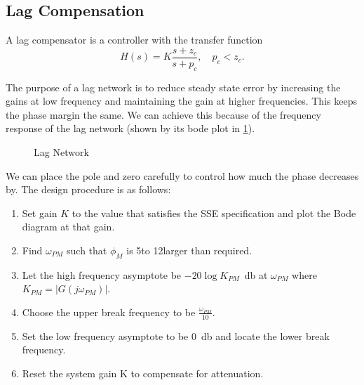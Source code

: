 \subsection{Lag Compensation}
\begin{definition}
  A lag compensator is a controller with the transfer function
  \[
	H(s) = K \frac{s+z_c}{s+p_c},\quad p_c < z_c.
  \]
  \label{defn:lag-network}
\end{definition}
The purpose of a lag network is to reduce steady state error by increasing the gains at low frequency and maintaining the gain at higher frequencies. This keeps the phase margin the same.
We can achieve this because of the frequency response of the lag network (shown by its bode plot in \cref{fig:lag-network}).

\begin{figure}
  \centering
  \caption{Lag Network}
  \label{fig:lag-network}
\end{figure}
We can place the pole and zero carefully to control how much the phase decreases by. The design procedure is as follows:
\begin{enumerate}
  \item Set gain $K$ to the value that satisfies the SSE specification and plot the Bode diagram at that gain.
  \item Find $\omega_{PM}$ such that $\phi_M$ is 5\textdegree  to 12\textdegree  larger than required.
  \item Let the high frequency asymptote be $-20\log K_{PM}$\SI{}{\decibel} at $\omega_{PM}$ where $K_{PM} = |G(j\omega_{PM})|$.
  \item Choose the upper break frequency to be $\frac{\omega_{PM}}{10}$.
  \item Set the low frequency asymptote to be \SI{0}{\decibel} and locate the lower break frequency.
  \item Reset the system gain K to compensate for attenuation.
\end{enumerate}
